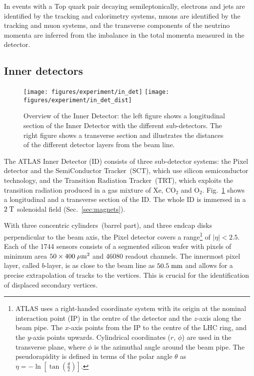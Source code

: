 In events with a Top quark pair decaying semileptonically, electrons
and jets are identified by the tracking and calorimetry systems, muons
are identified by the tracking and muon systems, and the transverse
components of the neutrino momenta are inferred from the imbalance in
the total momenta measured in the detector.


\subsection{Inner detectors}
\label{sec:ID}

\begin{figure}[h]
\centering
\texttt{[image: figures/experiment/in\_det]}
\texttt{[image: figures/experiment/in\_det\_dist]}
\caption[Overview of the Inner Detector]{
  Overview of the Inner Detector: 
  the left figure shows a longitudinal section of the Inner Detector
  with the different sub-detectors.
  The right figure shows a transverse section and illustrates the
  distances of the different detector layers from the beam line.}
\label{fig:ID}
\end{figure}

The ATLAS Inner Detector (ID) consists of three sub-detector systems:
the Pixel detector and the SemiConductor Tracker~(SCT), which use silicon semiconductor
technology, and the Transition Radiation Tracker~(TRT), 
which exploits the transition radiation produced in a gas mixture of Xe, CO$_2$ and O$_2$.
Fig.~\ref{fig:ID} shows a longitudinal and a transverse section of the ID.
The whole ID is immersed in a \mbox{$2 \; \mathrm{T}$} solenoidal field (Sec.~\ref{sec:magnets}).

With three concentric cylinders~(barrel part), and three endcap disks
perpendicular to the beam axis, the Pixel detector covers a
range\footnote{ATLAS uses a right-handed coordinate system
  with its origin at the nominal interaction point (IP) in the centre
  of the detector and the $z$-axis along the beam pipe. 
  The $x$-axis points from the IP to the centre of the LHC ring, and the $y$-axis points
  upwards. Cylindrical coordinates ($r$, $\phi$) are used in the
  transverse plane, where $\phi$ is the azimuthal angle around the beam pipe. The
  pseudorapidity is defined in terms of the polar angle $\theta$ as 
  \mbox{$\eta = - \ln \left[ \tan \left( \frac{\theta}{2} \right)
    \right]$}.} of \mbox{$|\eta| < 2.5$}.
Each of the 1744 sensors consists of a segmented silicon wafer with
pixels of minimum area \mbox{$50 \times 400 \; \mu\mathrm{m}^2$} and 46080 readout channels.
The innermost pixel layer, called $b$-layer, is as close to the beam
line as \mbox{$50.5 \; \mathrm{mm}$} and allows for a precise extrapolation of tracks
to the vertices.
This is crucial for the identification of displaced secondary vertices.


